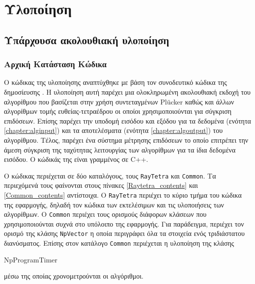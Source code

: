 \DefineShortVerb{\!}
\chapter{Υλοποίηση}
\section{Υπάρχουσα ακολουθιακή υλοποίηση}
\subsection{Αρχική Κατάσταση Κώδικα}
\label{chapter:initial}
\noindent Ο κώδικας της υλοποίησης αναπτύχθηκε με βάση τον συνοδευτικό κώδικα της δημοσίευσης \cite{PlatisTheoharis03}. Η υλοποίηση αυτή παρέχει μια ολοκληρωμένη ακολουθιακή εκδοχή του αλγορίθμου που βασίζεται στην χρήση συντεταγμένων Plücker καθώς και άλλων αλγορίθμων τομής ευθείας-τετραέδρου οι οποίοι χρησιμοποιούνται για σύγκριση επιδόσεων. Επίσης παρέχει την υποδομή εισόδου και εξόδου για τα δεδομένα (ενότητα \ref{chapter:alginput}) και τα αποτελέσματα (ενότητα  \ref{chapter:algoutput}) του αλγορίθμου. Τέλος, παρέχει ένα σύστημα μέτρησης επιδόσεων το οποίο επιτρέπει την άμεση σύγκριση της ταχύτητας λειτουργίας των αλγορίθμων για τα ίδια δεδομένα εισόδου. Ο κώδικάς της είναι γραμμένος σε C++.

Ο κώδικας περιέχεται σε δύο καταλόγους, τους \verb!RayTetra! και \verb!Common!. Τα περιεχόμενά τους φαίνονται στους πίνακες \ref{Raytetra_contents} και \ref{Common_contents} αντίστοιχα. Ο \verb!RayΤetra! περιέχει το κύριο τμήμα του κώδικα της εφαρμογής, δηλαδή τον κώδικα των εκτελέσιμων και τις υλοποιήσεις των αλγορίθμων. O \verb!Common! περιέχει τους ορισμούς διάφορων κλάσεων που χρησιμοποιούνται συχνά στο υπόλοιπο της εφαρμογής. Για παράδειγμα, περιέχει τον ορισμό της κλάσης \verb!NpVector! η οποία περιγράφει όλα τα στοιχεία ενός τριδιάστατου διανύσματος. Επίσης στον κατάλογο \verb!Common! περιέχεται η υλοποίηση της κλάσης \begin{english}NpProgramTimer\end{english} μέσω της οποίας χρονομετρούνται οι αλγόριθμοι. 


